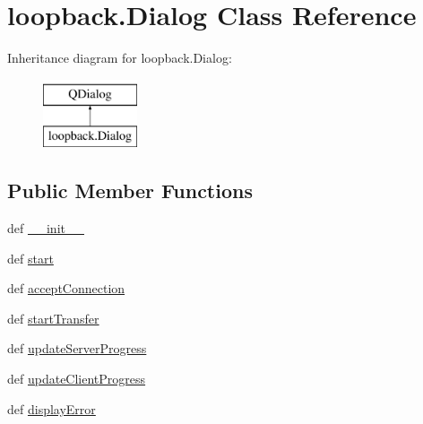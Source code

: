 \hypertarget{classloopback_1_1Dialog}{}\section{loopback.\+Dialog Class Reference}
\label{classloopback_1_1Dialog}
Inheritance diagram for loopback.\+Dialog\+:\begin{figure}[H]
\begin{center}
\leavevmode
\includegraphics[height=2.000000cm]{classloopback_1_1Dialog}
\end{center}
\end{figure}
\subsection*{Public Member Functions}
\begin{DoxyCompactItemize}
\item 
def \hyperlink{classloopback_1_1Dialog_a814bbda466541a52deb357724a3d4b64}{\+\_\+\+\_\+init\+\_\+\+\_\+}
\item 
def \hyperlink{classloopback_1_1Dialog_a0fabfcf82b2b3fbdbe65e3cefdecd1f4}{start}
\item 
def \hyperlink{classloopback_1_1Dialog_a0507c562aa326e146cb539becb9a4310}{accept\+Connection}
\item 
def \hyperlink{classloopback_1_1Dialog_a257124c0a983bedb5762ddaf218f93dd}{start\+Transfer}
\item 
def \hyperlink{classloopback_1_1Dialog_a8ec0a0941f1df3b62abbd71d9f4aba3e}{update\+Server\+Progress}
\item 
def \hyperlink{classloopback_1_1Dialog_a0ffcc99ffacaed9ccf9ad6fd087ccf70}{update\+Client\+Progress}
\item 
def \hyperlink{classloopback_1_1Dialog_af59e60232ec2cb4649bed9075490d2c4}{display\+Error}
\end{DoxyCompactItemize}
